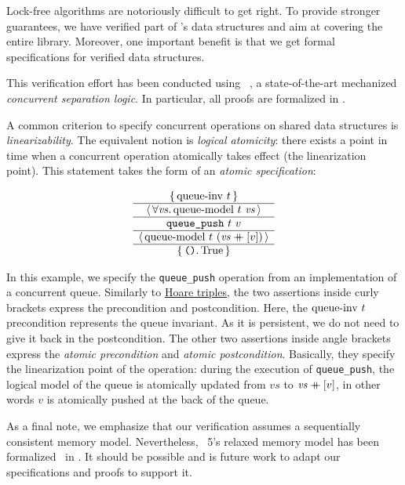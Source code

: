 \documentclass[a4paper, 11pt]{article}
\begin{document}
Lock-free algorithms are notoriously difficult to get right.
To provide stronger guarantees, we have verified part of \Saturn's data structures and aim at covering the entire library.
Moreover, one important benefit is that we get formal specifications for verified data structures.

This verification effort has been conducted using \Iris~\cite{DBLP:journals/jfp/JungKJBBD18}, a state-of-the-art mechanized \emph{concurrent separation logic}.
In particular, all proofs are formalized in \Coq.

A common criterion to specify concurrent operations on shared data structures is \emph{linearizability}.
The equivalent \Iris notion is \emph{logical atomicity}: there exists a point in time when a concurrent operation atomically takes effect (the linearization point).
This statement takes the form of an \emph{atomic specification}:

\[
  \begin{array}{c} \left\lbrace\, 
    \mathrm{queue {\hbox{-}} inv}\ t
   \,\right\rbrace \\ \hline \left\langle\, \forall 
    \mathit{vs}
   \ldotp 
    \mathrm{queue {\hbox{-}} model}\ t\  \mathit{vs}
   \,\right\rangle \\ \hline 
    \texttt{queue\_push}\ t\ v
   \\ \hline \left\langle\, 
    \mathrm{queue {\hbox{-}} model}\ t\  (\mathit{vs} \mathbin{+\mkern-10mu+} [v])
   \,\right\rangle \\ \hline \left\lbrace\, 
    \texttt{()}
   \ldotp 
    \mathrm{True}
   \,\right\rbrace \end{array}
\]

In this example, we specify the \texttt{queue\_push} operation from an implementation of a concurrent queue.
Similarly to \href{https://en.wikipedia.org/wiki/Hoare_logic}{Hoare triples}, the two assertions inside curly brackets express the precondition and postcondition.
Here, the $\mathrm{queue {\hbox{-}} inv}\ t$ precondition represents the queue invariant.
As it is persistent, we do not need to give it back in the postcondition.
The other two assertions inside angle brackets express the \emph{atomic precondition} and \emph{atomic postcondition}.
Basically, they specify the linearization point of the operation: during the execution of \texttt{queue\_push}, the logical model of the queue is atomically updated from $\mathit{vs}$ to $\mathit{vs} \mathbin{+\mkern-10mu+} [v]$, in other words $v$ is atomically pushed at the back of the queue.

As a final note, we emphasize that our verification assumes a sequentially consistent memory model.
Nevertheless, \OCaml~5's relaxed memory model has been formalized~\cite{DBLP:journals/pacmpl/MevelJP20} in \Iris.
It should be possible and is future work to adapt our specifications and proofs to support it.

\end{document}
